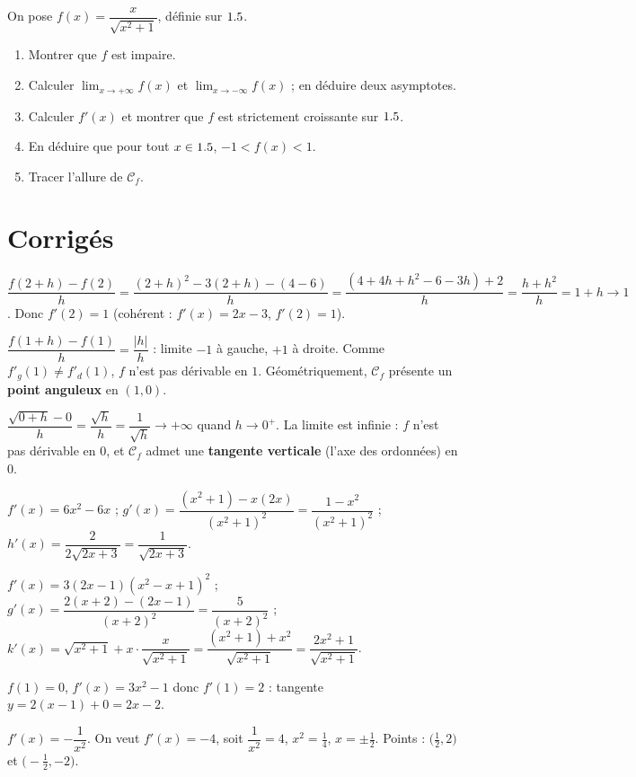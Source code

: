 On pose $f(x)=\dfrac{x}{\sqrt{x^{2}+1}}$, définie sur $1.5$.
\begin{enumerate}[label=\arabic*)]
\item Montrer que $f$ est impaire.
\item Calculer $\displaystyle\lim_{x\to+\infty}f(x)$ et $\displaystyle\lim_{x\to-\infty}f(x)$ ; en déduire deux asymptotes.
\item Calculer $f'(x)$ et montrer que $f$ est strictement croissante sur $1.5$.
\item En déduire que pour tout $x\in1.5$, $-1<f(x)<1$.
\item Tracer l'allure de $\mathcal C_f$.
\end{enumerate}

\section{Corrigés}

$\dfrac{f(2+h)-f(2)}{h}=\dfrac{(2+h)^{2}-3(2+h)-(4-6)}{h}=\dfrac{(4+4h+h^{2}-6-3h)+2}{h}
=\dfrac{h+h^{2}}{h}=1+h\to1$. Donc $f'(2)=1$ (cohérent : $f'(x)=2x-3$, $f'(2)=1$).

$\dfrac{f(1+h)-f(1)}{h}=\dfrac{|h|}{h}$ : limite $-1$ à gauche, $+1$ à droite. Comme
$f'_g(1)\ne f'_d(1)$, $f$ n'est pas dérivable en $1$. Géométriquement, $\mathcal C_f$
présente un \textbf{point anguleux} en $(1,0)$.

$\dfrac{\sqrt{0+h}-0}{h}=\dfrac{\sqrt h}{h}=\dfrac1{\sqrt h}\to+\infty$ quand $h\to0^{+}$.
La limite est infinie : $f$ n'est pas dérivable en $0$, et $\mathcal C_f$ admet une
\textbf{tangente verticale} (l'axe des ordonnées) en $0$.

$f'(x)=6x^{2}-6x$ ; $g'(x)=\dfrac{(x^{2}+1)-x(2x)}{(x^{2}+1)^{2}}=\dfrac{1-x^{2}}{(x^{2}+1)^{2}}$ ;
$h'(x)=\dfrac{2}{2\sqrt{2x+3}}=\dfrac1{\sqrt{2x+3}}$.

$f'(x)=3(2x-1)(x^{2}-x+1)^{2}$ ;\
$g'(x)=\dfrac{2(x+2)-(2x-1)}{(x+2)^{2}}=\dfrac{5}{(x+2)^{2}}$ ;\
$k'(x)=\sqrt{x^{2}+1}+x\cdot\dfrac{x}{\sqrt{x^{2}+1}}=\dfrac{(x^{2}+1)+x^{2}}{\sqrt{x^{2}+1}}
=\dfrac{2x^{2}+1}{\sqrt{x^{2}+1}}$.

$f(1)=0$, $f'(x)=3x^{2}-1$ donc $f'(1)=2$ : tangente $y=2(x-1)+0=2x-2$.

\corrige{de l'exercice 7}
$f'(x)=-\dfrac1{x^{2}}$. On veut $f'(x)=-4$, soit $\dfrac1{x^{2}}=4$, $x^{2}=\tfrac14$,
$x=\pm\tfrac12$. Points : $\big(\tfrac12,2\big)$ et $\big(-\tfrac12,-2\big)$.

